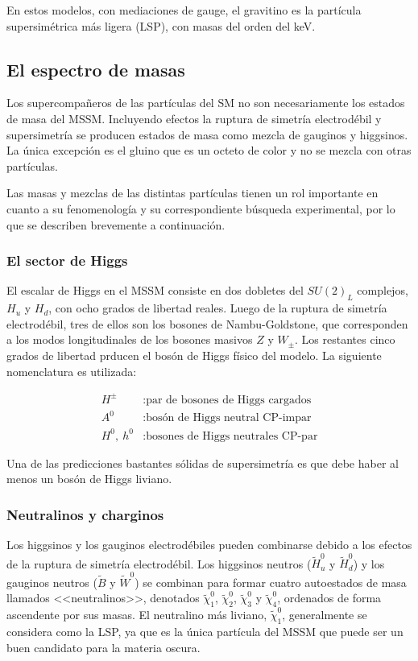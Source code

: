 En estos modelos, con mediaciones de gauge, el gravitino es la partícula supersimétrica más ligera (LSP), con masas del orden del keV.

\subsection{El espectro de masas}

Los supercompañeros de las partículas del SM no son necesariamente los estados de masa del MSSM. Incluyendo efectos la ruptura de simetría electrodébil y supersimetría se producen estados de masa como mezcla de gauginos y higgsinos. La única excepción es el gluino que es un octeto de color y no se mezcla con otras partículas.

Las masas y mezclas de las distintas partículas tienen un rol importante en cuanto a su fenomenología y su correspondiente búsqueda experimental, por lo que se describen brevemente a continuación.


\subsubsection{El sector de Higgs} 

El escalar de Higgs en el MSSM consiste en dos dobletes del $SU(2)_{L}$ complejos, $H_{u}$ y $H_{d}$, con ocho grados de libertad reales. Luego de la ruptura de simetría electrodébil, tres de ellos son los bosones de Nambu-Goldstone, que corresponden a los modos longitudinales de los bosones masivos $Z$ y $W_{\pm}$. Los restantes cinco grados de libertad prducen el bosón de Higgs físico del modelo. La siguiente nomenclatura es utilizada:

\begin{align*}
  H^{\pm} & : \text{par de bosones de Higgs cargados} \\
  A^{0} & : \text{bosón de Higgs neutral CP-impar} \\
  H^{0},\: h^{0} & : \text{bosones de Higgs neutrales CP-par} 
\end{align*}

Una de las predicciones bastantes sólidas de supersimetría es que debe haber al menos un bosón de Higgs liviano.


\subsubsection{Neutralinos y charginos}

Los higgsinos y los gauginos electrodébiles pueden combinarse debido a los efectos de la ruptura de simetría electrodébil. Los higgsinos neutros ($\widetilde{H}^{0}_{u}$ y $\widetilde{H}^{0}_{d}$) y los gauginos neutros ($\widetilde{B}$ y $\widetilde{W}^{0}$) se combinan para formar cuatro autoestados de masa llamados <<neutralinos>>, denotados $\widetilde{\chi}^{0}_{1}$, $\widetilde{\chi}^{0}_{2}$, $\widetilde{\chi}^{0}_{3}$ y $\widetilde{\chi}^{0}_{4}$, ordenados de forma ascendente por sus masas. El neutralino más liviano, $\widetilde{\chi}^{0}_{1}$, generalmente se considera como la LSP, ya que es la única partícula del MSSM que puede ser un buen candidato para la materia oscura. 

